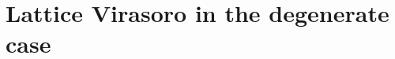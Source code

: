 \documentclass[a4paper,10pt]{article}
\newcommand{\linnea}[1]{$\framebox{\tiny L}$\ \textbf{\texttt{{\color{red}\footnotesize#1}}}}
\newcommand{\jesper}[1]{$\framebox{\tiny J}$\ \textbf{\texttt{{\color{cyan}\footnotesize#1}}}}
\begin{document}



\section{Lattice Virasoro in the degenerate case}\label{PartlyNonGeneric}
\end{document}
